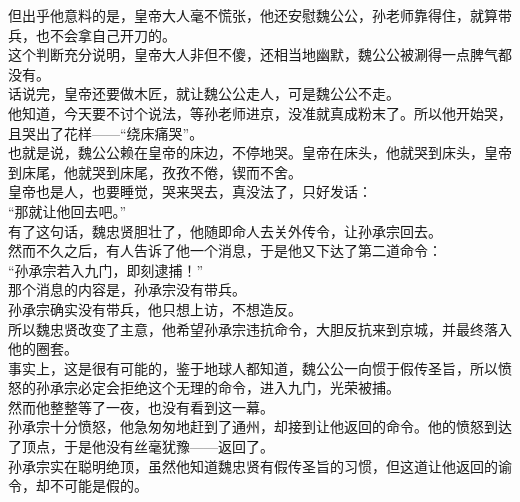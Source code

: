 \begin{multicols}{\theparacolNo}
但出乎他意料的是，皇帝大人毫不慌张，他还安慰魏公公，孙老师靠得住，就算带兵，也不会拿自己开刀的。\\

这个判断充分说明，皇帝大人非但不傻，还相当地幽默，魏公公被涮得一点脾气都没有。\\

话说完，皇帝还要做木匠，就让魏公公走人，可是魏公公不走。\\

他知道，今天要不讨个说法，等孙老师进京，没准就真成粉末了。所以他开始哭，且哭出了花样——“绕床痛哭”。\\

也就是说，魏公公赖在皇帝的床边，不停地哭。皇帝在床头，他就哭到床头，皇帝到床尾，他就哭到床尾，孜孜不倦，锲而不舍。\\

皇帝也是人，也要睡觉，哭来哭去，真没法了，只好发话：\\

“那就让他回去吧。”\\

有了这句话，魏忠贤胆壮了，他随即命人去关外传令，让孙承宗回去。\\

然而不久之后，有人告诉了他一个消息，于是他又下达了第二道命令：\\

“孙承宗若入九门，即刻逮捕！”\\

那个消息的内容是，孙承宗没有带兵。\\

孙承宗确实没有带兵，他只想上访，不想造反。\\

所以魏忠贤改变了主意，他希望孙承宗违抗命令，大胆反抗来到京城，并最终落入他的圈套。\\

事实上，这是很有可能的，鉴于地球人都知道，魏公公一向惯于假传圣旨，所以愤怒的孙承宗必定会拒绝这个无理的命令，进入九门，光荣被捕。\\

然而他整整等了一夜，也没有看到这一幕。\\

孙承宗十分愤怒，他急匆匆地赶到了通州，却接到让他返回的命令。他的愤怒到达了顶点，于是他没有丝毫犹豫——返回了。\\

孙承宗实在聪明绝顶，虽然他知道魏忠贤有假传圣旨的习惯，但这道让他返回的谕令，却不可能是假的。\\


\end{multicols}
